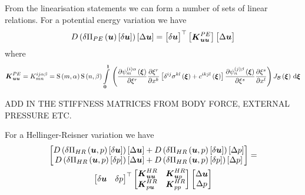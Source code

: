 From the linearisation statements we can form a number of sets of linear
relations. For a potential energy variation we have
\begin{equation}
  \directionalderiv{}{\variation{\fnof{\Pi_{PE}}{\vectr{u}}}{\vectr{u}}}{\linearisationdir{\vectr{u}}}=\transpose{
    \begin{bmatrix}\variationdir{\vectr{u}}\end{bmatrix}}\begin{bmatrix}\matr{K}^{PE}_{\vectr{u}\vectr{u}}\end{bmatrix}
  \begin{bmatrix}\linearisationdir{\vectr{u}}\end{bmatrix}
\end{equation}
where
\begin{equation}
  \matr{K}^{PE}_{\vectr{u}\vectr{u}}=K^{ij\alpha\beta}_{mn}=\gsf{m}{\alpha}\gsf{n}{\beta}\gint{\vectr{0}}{\vectr{1}}{\pbrac{\delby{\idxgbfn{\pbrac{i}}{m}{\alpha}{\vectr{\xi}}}{\xi^{r}}\delby{\xi^{r}}{x^{k}}\sqbrac{\contrakronecker{i}{j}\fnof{\sigma^{kl}}{\vect{\xi}}+\fnof{c^{ikjl}}{\vect{\xi}}}\delby{\idxgbfn{\pbrac{j}}{n}{\beta}{\vect{\xi}}}{\xi^{s}}\delby{\xi^{s}}{x^{l}}}\fnof{J_{\embedmanifold{B}}}{\vectr{\xi}}}{\vect{\xi}}
\end{equation}

ADD IN THE STIFFNESS MATRICES FROM BODY FORCE, EXTERNAL PRESSURE ETC. 

For a Hellinger-Reisner variation we have
\begin{multline}
  \begin{bmatrix}
    \directionalderiv{}{\variation{\fnof{\Pi_{HR}}{\vectr{u},p}}{\vectr{u}}}{\linearisationdir{\vectr{u}}}
    + \directionalderiv{}{\variation{\fnof{\Pi_{HR}}{\vectr{u},p}}{\vectr{u}}}{\linearisationdir{p}} \\
    \directionalderiv{}{\variation{\fnof{\Pi_{HR}}{\vectr{u},p}}{p}}{\linearisationdir{\vectr{u}}}
    + \directionalderiv{}{\variation{\fnof{\Pi_{HR}}{\vectr{u},p}}{p}}{\linearisationdir{p}}
  \end{bmatrix} = \\
  \transpose{\begin{bmatrix}
    \variationdir{\vectr{u}} & \variationdir{p}
  \end{bmatrix}}
  \begin{bmatrix}
    \matr{K}^{HR}_{\vectr{u}\vectr{u}} & \matr{K}^{HR}_{\vectr{u}p} \\
    \matr{K}^{HR}_{p\vectr{u}} & \matr{K}^{HR}_{pp}
  \end{bmatrix}
  \begin{bmatrix}
    \linearisationdir{\vectr{u}} \\
    \linearisationdir{p}
  \end{bmatrix}
\end{multline}

